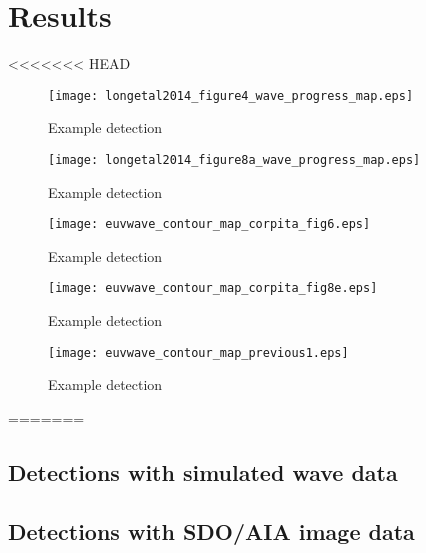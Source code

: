 \section{Results}\label{sec:results}

<<<<<<< HEAD
\begin{figure}
\begin{center}
\texttt{[image: longetal2014\_figure4\_wave\_progress\_map.eps]}

\caption{Example detection}
\label{corpita_fig4}
\end{center}
\end{figure}

\begin{figure}
\begin{center}
\texttt{[image: longetal2014\_figure8a\_wave\_progress\_map.eps]}
\caption{Example detection}
\label{corpita_fig8a}
\end{center}
\end{figure}

\begin{figure}
\begin{center}
\texttt{[image: euvwave\_contour\_map\_corpita\_fig6.eps]}
\caption{Example detection}
\label{corpita_fig6}
\end{center}
\end{figure}

\begin{figure}
\begin{center}
\texttt{[image: euvwave\_contour\_map\_corpita\_fig8e.eps]}
\caption{Example detection}
\label{corpita_fig8e}
\end{center}
\end{figure}

\begin{figure}
\begin{center}
\texttt{[image: euvwave\_contour\_map\_previous1.eps]}
\caption{Example detection}
\label{previous1}
\end{center}
\end{figure}
=======
\subsection{Detections with simulated wave data}

\subsection{Detections with SDO/AIA image data}

